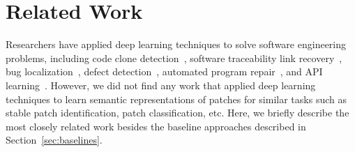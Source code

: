 \section{Related Work}
\label{sec:related_work}

Researchers have applied deep learning techniques to solve software
engineering problems, including code clone
detection~\cite{white2016deep,li2017cclearner,bui2018hierarchical}, software traceability link
recovery~\cite{guo2017semantically}, bug
localization~\cite{huo2016learning, lam2017bug}, defect
detection~\cite{yang2015deep, wang2016automatically}, automated program
repair~\cite{gupta2017deepfix}, and API
learning~\cite{gu2016deep}. However, we did not find any work that applied
deep learning techniques to learn semantic representations of patches for
similar tasks such as stable patch identification, patch classification, etc. Here, we briefly describe the most closely related work besides the baseline approaches described in Section~\ref{sec:baselines}.



